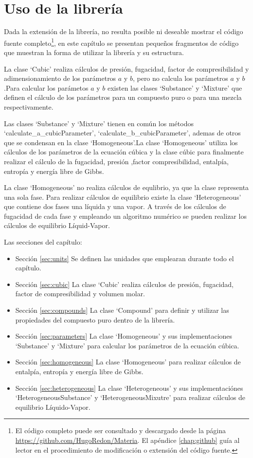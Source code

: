 \chapter{Uso de la librería}\label{chap:libraryUse}
	
	Dada la extensión de la librería, no resulta posible ni deseable mostrar el código fuente completo\footnote{El código completo puede ser consultado y descargado desde la página \url{https://github.com/HugoRedon/Materia}. El apéndice \ref{chap:github} guía al lector en el procedimiento de modificación o extensión del código fuente.}, en este capítulo se presentan pequeños fragmentos de código que muestran la forma de utilizar la librería y su estructura.
		
	La clase `Cubic' realiza cálculos de presión, fugacidad, factor de compresibilidad y adimensionamiento de los parámetros $a$ y $b$, pero no calcula los parámetros $a$ y $b$.Para calcular los parámetos $a$ y $b$ existen las clases `Substance' y `Mixture' que definen el cálculo de los parámetros para un compuesto puro o para una mezcla respectivamente. 

	Las clases `Substance' y `Mixture' tienen en común los métodos `calculate\_a\_cubicParameter', `calculate\_b\_cubicParameter', ademas de otros que se condensan en la clase `Homogeneous'.La clase `Homogeneous' utiliza los cálculos de los parámetros de la ecuación cúbica y la clase cúbic para finalmente realizar el cálculo de la fugacidad, presión ,factor compresibilidad, entalpía, entropía y energía libre de Gibbs.

	La clase `Homogeneous' no realiza cálculos de equlibrio, ya que la clase representa una sola fase. Para realizar cálculos de equilibrio existe la clase `Heterogeneous' que contiene dos fases una líquida y una vapor. A través de los cálculos de fugacidad de cada fase y empleando un algoritmo numérico se pueden realizar los cálculos de equilibrio Líquid-Vapor.


	Las secciones del capítulo:
	\begin{itemize}
		\item{Sección} \ref{sec:units} Se definen las unidades que emplearan durante todo el capítulo.
		\item{Sección} \ref{sec:cubic}  La clase `Cubic' realiza cálculos de presión, fugacidad, factor de compresibilidad y volumen molar.
		\item{Sección} \ref{sec:compounds} La clase `Compound' para definir y utilizar las propiedades del compuesto puro dentro de la librería.
		\item {Sección} \ref{sec:parameters} La clase `Homogeneous' y sus implementaciones `Substance' y `Mixture' para calcular los parámetros de la ecuación cúbica.
		\item {Sección} \ref{sec:homogeneous} La clase `Homogeneous' para realizar cálculos de entalpía, entropía y energía libre de Gibbs.
		\item {Sección} \ref{sec:heterogeneous} La clase `Heterogeneous' y sus implementaciónes `HeterogeneousSubstance' y `HeterogeneousMixutre' para realizar cálculos de equilibrio Líquido-Vapor.
	\end{itemize}
